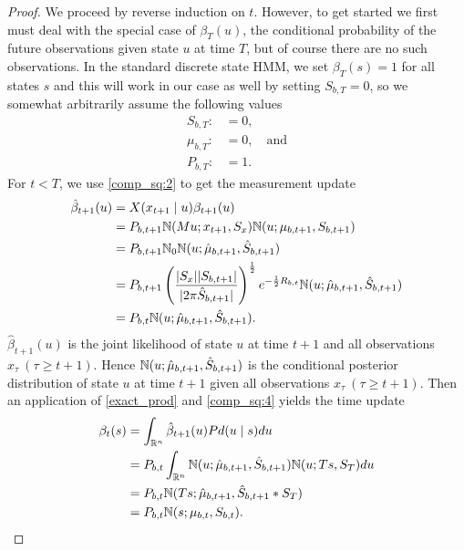 \documentclass[12pt,leqno]{article}
\begin{document}
\begin{proof}
We proceed by reverse induction on $t$. However, to get started we first must  deal with
the special case of $\beta_{T}(u)$, the conditional probability of the future observations given
state $u$ at time $T$, but of course there are no such observations.  In the standard discrete
state HMM, we set $\beta_T(s) = 1$ for all states $s$ and this will work in our case as well by
setting $S_{b,T} = 0$, so we somewhat arbitrarily assume the following values
\begin{align*}
  S_{b,T} :&= 0,\\
  \mu_{b,T} :&= 0,\quad\text{and}\\
  P_{b,T} :&= 1.
\end{align*}
  For $t <  T$, we use \eqref{comp_sq:2} to get the measurement update 
  \begin{equation}\label{beta_hat}
    \begin{split}
    \hat{\beta}_{t+1}(u) &= X(x_{t+1}\mid u)\beta_{t+1}(u)\\
    &= P_{b,t+1}{\mathbb N}(Mu;x_{t+1},S_x){\mathbb N}(u;\mu_{b,t+1},S_{b,t+1})\\
    &= P_{b,t+1}{\mathbb N}_0{\mathbb N}(u;\hat{\mu}_{b,t+1},\hat{S}_{b,t+1})\\
  &= P_{b,t+1}\left(\frac{|S_x||S_{b,t+1}|}{|2\pi \hat{S}_{b,t+1}|}\right)^{\frac{1}{2}}e^{-\frac{1}{2}R_{b,t}}
  {\mathbb N}(u;\hat{\mu}_{b,t+1},\hat{S}_{b,t+1})\\
    &= P_{b,t}{\mathbb N}(u;\hat{\mu}_{b,t+1},\hat{S}_{b,t+1}).
    \end{split}
    \end{equation}
  $\hat{\beta}_{t+1}(u)$ is the joint likelihood of state $u$ at time $t+1$ and all observations $x_\tau~
  (\tau \ge t+1)$.  Hence ${\mathbb N}(u;\hat{\mu}_{b,t+1},\hat{S}_{b,t+1})$ is the conditional posterior distribution of
  state $u$ at time $t+1$ given all observations $x_\tau~(\tau \ge t+1)$. Then an application of \eqref{exact_prod}
  and \eqref{comp_sq:4} yields the time update
  \begin{align*}
    \beta_t(s) &= \int_{{\mathbb R}^n}\hat{\beta}_{t+1}(u)Pd(u\mid s)du \\
    &= P_{b,t}\int_{{\mathbb R}^n}{\mathbb N}(u;\hat{\mu}_{b,t+1},\hat{S}_{b,t+1}){\mathbb N}(u;Ts,S_T)du\\
    &=P_{b,t}{\mathbb N}(Ts;\hat{\mu}_{b,t+1},\hat{S}_{b,t+1}*S_T)\\
    &=P_{b,t}{\mathbb N}(s;\mu_{b,t},S_{b,t}).
  \end{align*}
\end{proof}
\newpage
\end{document}
